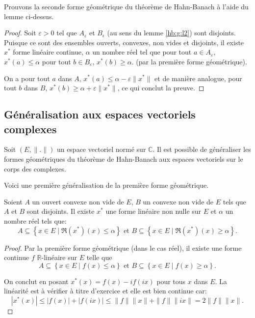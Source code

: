 Prouvons la seconde forme géométrique du théorème de Hahn-Banach à l'aide
du lemme ci-dessus.

\begin{proof}
  Soit $\varepsilon> 0 $ tel que $A_\varepsilon$ et $B_\epsilon$ (au sens du
  lemme \ref{hb:g:l2}) sont disjoints. Puisque ce sont des ensembles ouverts,
  convexes, non vides et disjoints, il existe $x^*$ forme linéaire continue,
  $\alpha$ un nombre réel tel que pour tout $a\in A_\varepsilon$,
  $x^*(a)\leq\alpha$ pour tout $b\in B_\varepsilon$, $x^*(b)\geq \alpha$.
  (par la première forme géométrique).

  On a pour tout $a$ dans $A$, $x^*(a)\leq \alpha - \varepsilon\|x^*\|$ et
  de manière analogue,
  pour tout $b$ dans $B$, $x^*(b)\geq \alpha +\varepsilon \|x^*\|$, ce qui
  conclut la preuve.

\end{proof}

\subsection{Généralisation aux espaces vectoriels complexes}
Soit $(E, \|.\|)$ un espace vectoriel normé sur $\mathbb{C}$. Il est
possible de généraliser les formes géométriques du théorème de Hahn-Banach
aux espaces vectoriels sur le corps des complexes.


Voici une première généralisation de la première forme géométrique.
\begin{thm}\label{hb:g:c1}
  Soient $A$ un ouvert convexe non vide de $E$, $B$ un
  convexe non vide de $E$ tels que $A$ et $B$ sont disjoints. Il existe
  $x^*$ une forme linéaire non nulle sur $E$ et $\alpha$ un nombre réel tels que:
  $$A\subseteq \left\{x\in E\mid \Re(x^*)(x) \leq \alpha\right\} \mbox{ et }
  B\subseteq \left\{x\in E\mid \Re(x^*)(x) \geq \alpha\right\}.$$
\end{thm}

\begin{proof}
  Par la première forme géométrique (dans le cas réel), il existe une forme continue $f$
  $\mathbb{R}$-linéaire sur $E$ telle que
  $$A\subseteq \left\{x\in E\mid f(x) \leq \alpha\right\} \mbox{ et }
  B\subseteq \left\{x\in E\mid f(x) \geq \alpha\right\}. $$

  On conclut en posant $x^*(x) = f(x) - if(ix)$ pour tous $x$ dans $E$.
  La linéarité est à vérifier à titre d'exercice et
  elle est bien continue car: $$|x^*(x)|\leq |f(x)|+|f(ix)|\leq
  \|f\|\|x\|+\|f\|\|ix\| = 2 \|f\|\|x\|.$$
\end{proof}

